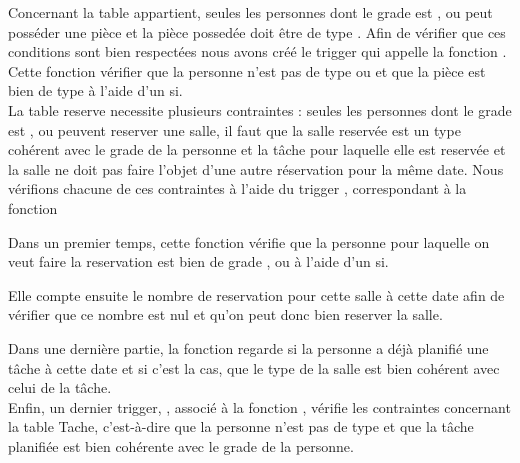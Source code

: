 Concernant la table appartient, seules les personnes dont le grade est ,  ou  peut posséder une pièce et la pièce possedée doit être de type . Afin de vérifier que ces conditions sont bien respectées nous avons créé le trigger  qui appelle la fonction . Cette fonction vérifier que la personne n'est pas de type  ou  et que la pièce est bien de type  à l'aide d'un si.\\


La table reserve necessite plusieurs contraintes : seules les personnes dont le grade est ,  ou  peuvent reserver une salle, il faut que la salle reservée est un type cohérent avec le grade de la personne et la tâche pour laquelle elle est reservée et la salle ne doit pas faire l'objet d'une autre réservation pour la même date. Nous vérifions chacune de ces contraintes à l'aide du trigger , correspondant à la fonction 

Dans un premier temps, cette fonction vérifie que la personne pour laquelle on veut faire la reservation est bien de grade ,  ou  à l'aide d'un si.

Elle compte ensuite le nombre de reservation pour cette salle à cette date afin de vérifier que ce nombre est nul et qu'on peut donc bien reserver la salle.

Dans une dernière partie, la fonction regarde si la personne a déjà planifié une tâche à cette date et si c'est la cas, que le type de la salle est bien cohérent avec celui de la tâche.\\

Enfin, un dernier trigger, , associé à la fonction , vérifie les contraintes concernant la table Tache, c'est-à-dire que la personne n'est pas de type  et que la tâche planifiée est bien cohérente avec le grade de la personne.
